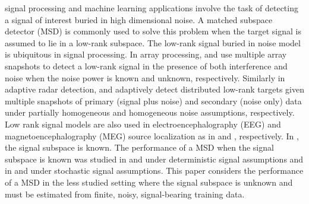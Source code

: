 
 signal processing  \cite{scharf1991statistical} and machine learning \cite{friedman2001elements} applications involve the task of detecting a signal of interest buried in high dimensional noise. A matched subspace detector (MSD) is commonly used to solve this problem when the target signal is assumed to lie in a low-rank subspace.  The low-rank signal buried in noise model is ubiquitous in signal processing. In array processing, \cite{besson2005matched} and \cite{besson2006cfar} use multiple array snapshots to detect a low-rank signal in the presence of both interference and noise when the noise power is known and unknown, respectively. Similarly in adaptive radar detection, \cite{bandiera2007adaptive} and \cite{bandiera2007glrt} adaptively detect distributed low-rank targets given multiple snapshots of primary (signal plus noise) and secondary (noise only) data under partially homogeneous and homogeneous noise assumptions, respectively. Low rank signal models are also used in electroencephalography (EEG) and magnetoencephalography (MEG) source localization as in \cite{maris2003resampling} and \cite{soong1995principal}, respectively. In \cite{besson2005matched,besson2006cfar,bandiera2007adaptive,bandiera2007glrt}, the signal subspace is known. The performance of a MSD when the signal subspace is known was studied in \cite{scharf1994matched} and \cite{vincent2008matched} under deterministic signal assumptions and in \cite{mcwhorter2003matched} and \cite{jin2005cfar} under stochastic signal assumptions. This paper considers the performance of a MSD in the less studied setting where the signal subspace is unknown and must be estimated from finite, noisy, signal-bearing training data.

